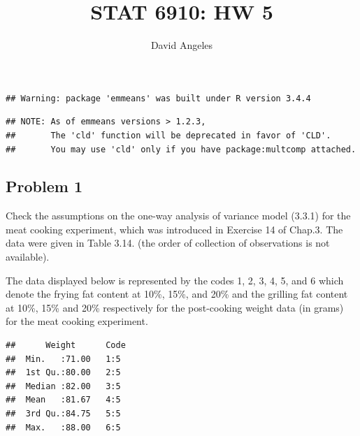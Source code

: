 \documentclass[12pt,]{article}
\title{STAT 6910: HW 5}
\author{David Angeles}
\date{}
\newenvironment{Shaded}{\begin{snugshade}}{\end{snugshade}}
\newcommand{\KeywordTok}[1]{\textcolor[rgb]{0.13,0.29,0.53}{\textbf{#1}}}
\newcommand{\StringTok}[1]{\textcolor[rgb]{0.31,0.60,0.02}{#1}}
\newcommand{\OperatorTok}[1]{\textcolor[rgb]{0.81,0.36,0.00}{\textbf{#1}}}
\newcommand{\NormalTok}[1]{#1}
\begin{document}
\maketitle

\begin{verbatim}
## Warning: package 'emmeans' was built under R version 3.4.4
\end{verbatim}

\begin{verbatim}
## NOTE: As of emmeans versions > 1.2.3,
##       The 'cld' function will be deprecated in favor of 'CLD'.
##       You may use 'cld' only if you have package:multcomp attached.
\end{verbatim}

\subsection{Problem 1}\label{problem-1}

Check the assumptions on the one-way analysis of variance model (3.3.1)
for the meat cooking experiment, which was introduced in Exercise 14 of
Chap.3. The data were given in Table 3.14. (the order of collection of
observations is not available).

The data displayed below is represented by the codes 1, 2, 3, 4, 5, and
6 which denote the frying fat content at 10\%, 15\%, and 20\% and the
grilling fat content at 10\%, 15\% and 20\% respectively for the
post-cooking weight data (in grams) for the meat cooking experiment.

\begin{Shaded}
\end{Shaded}

\begin{verbatim}
##      Weight      Code 
##  Min.   :71.00   1:5  
##  1st Qu.:80.00   2:5  
##  Median :82.00   3:5  
##  Mean   :81.67   4:5  
##  3rd Qu.:84.75   5:5  
##  Max.   :88.00   6:5
\end{verbatim}
\end{document}

